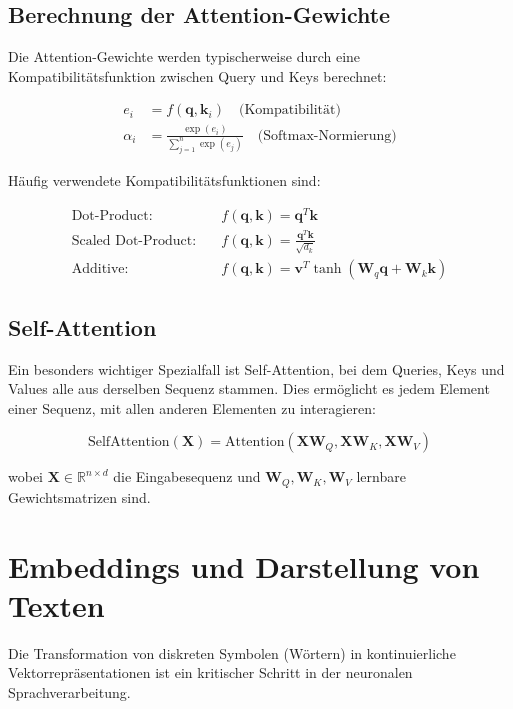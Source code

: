 \subsection{Berechnung der Attention-Gewichte}

Die Attention-Gewichte werden typischerweise durch eine Kompatibilitätsfunktion zwischen Query und Keys berechnet:

\begin{align}
e_i &= f(\mathbf{q}, \mathbf{k}_i) \quad \text{(Kompatibilität)} \\
\alpha_i &= \frac{\exp(e_i)}{\sum_{j=1}^{n} \exp(e_j)} \quad \text{(Softmax-Normierung)}
\end{align}

Häufig verwendete Kompatibilitätsfunktionen sind:

\begin{align}
\text{Dot-Product:} \quad &f(\mathbf{q}, \mathbf{k}) = \mathbf{q}^T \mathbf{k} \\
\text{Scaled Dot-Product:} \quad &f(\mathbf{q}, \mathbf{k}) = \frac{\mathbf{q}^T \mathbf{k}}{\sqrt{d_k}} \\
\text{Additive:} \quad &f(\mathbf{q}, \mathbf{k}) = \mathbf{v}^T \tanh(\mathbf{W}_q \mathbf{q} + \mathbf{W}_k \mathbf{k})
\end{align}

\subsection{Self-Attention}

Ein besonders wichtiger Spezialfall ist Self-Attention, bei dem Queries, Keys und Values alle aus derselben Sequenz stammen. Dies ermöglicht es jedem Element einer Sequenz, mit allen anderen Elementen zu interagieren:

\begin{equation}
\text{SelfAttention}(\mathbf{X}) = \text{Attention}(\mathbf{XW}_Q, \mathbf{XW}_K, \mathbf{XW}_V)
\end{equation}

wobei $\mathbf{X} \in \mathbb{R}^{n \times d}$ die Eingabesequenz und $\mathbf{W}_Q, \mathbf{W}_K, \mathbf{W}_V$ lernbare Gewichtsmatrizen sind.

\section{Embeddings und Darstellung von Texten}

Die Transformation von diskreten Symbolen (Wörtern) in kontinuierliche Vektorrepräsentationen ist ein kritischer Schritt in der neuronalen Sprachverarbeitung.


